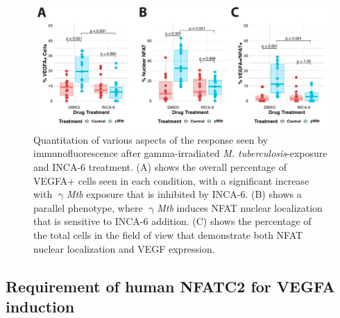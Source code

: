 \begin{figure}
\centering
\includegraphics[width=\textwidth]{images/incaIFquant.pdf}
\caption{Quantitation of various aspects of the response seen by immunofluorescence after gamma-irradiated \textit{M. tuberculosis}-exposure and INCA-6 treatment. (A) shows the overall percentage of VEGFA+ cells seen in each condition, with a significant increase with $\upgamma$\textit{Mtb} exposure that is inhibited by INCA-6. (B) shows a parallel phenotype, where $\upgamma$\textit{Mtb} induces NFAT nuclear localization that is sensitive to INCA-6 addition. (C) shows the percentage of the total cells in the field of view that demonstrate both NFAT nuclear localization and VEGF expression.}
\label{figure:incaquant}

\end{figure}

\subsection{Requirement of human NFATC2 for VEGFA induction}\label{thp1lenti}

